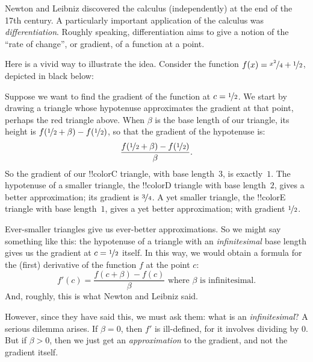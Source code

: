 \documentclass[../../../include/open-logic-section]{subfiles}
\begin{document}

Newton and Leibniz discovered the calculus (independently) at the end
of the 17th century. A particularly important application of the
calculus was \emph{differentiation}. Roughly speaking, differentiation
aims to give a notion of the ``rate of change'', or gradient, of a
function at a point. 

Here is a vivid way to illustrate the idea.  Consider the function
$f(x) = \nicefrac{x^2}{4} + \nicefrac{1}{2}$, depicted in black below:
\begin{center}
\end{center}
Suppose we want to find the gradient of the function at $c =
\nicefrac{1}{2}$. We start by drawing a triangle whose hypotenuse
approximates the gradient at that point, perhaps the red triangle
above. When $\beta$ is the base length of our triangle, its height is
$f(\nicefrac{1}{2}+\beta) - f(\nicefrac{1}{2})$, so that the gradient
of the hypotenuse is:
\[
\frac{f(\nicefrac{1}{2}+\beta) - f(\nicefrac{1}{2})}{\beta}.
\]
So the gradient of our !!{colorC} triangle, with base length~$3$, is
exactly~$1$. The hypotenuse of a smaller triangle, the !!{colorD}
triangle with base length~$2$, gives a better approximation; its
gradient is $\nicefrac{3}{4}$. A yet smaller triangle, the !!{colorE}
triangle with base length~$1$, gives a yet better approximation; with
gradient $\nicefrac{1}{2}$. 

Ever-smaller triangles give us ever-better approximations. So we might
say something like this: the hypotenuse of a triangle with an
\emph{infinitesimal} base length gives us the gradient at $c =
\nicefrac{1}{2}$ itself. In this way, we would obtain a formula for
the (first) derivative of the function $f$ at the point $c$:
\[
{f'}(c) = \frac{f(c+\beta) - f(c)}{\beta} \text{ where $\beta$ is infinitesimal.}
\]
And, roughly, this is what Newton and Leibniz said. 

However, since they have said this, we must ask them: what is an
\emph{infinitesimal}? A serious dilemma arises. If $\beta = 0$, then
$f'$ is ill-defined, for it involves dividing by $0$. But if $\beta >
0$, then we just get an \emph{approximation} to the gradient, and not
the gradient itself. 
\end{document}
